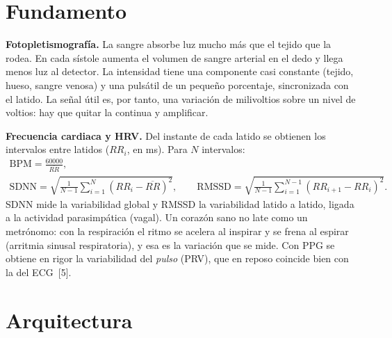 \documentclass[11pt,a4paper]{article}
\begin{document}
\section{Fundamento}

\textbf{Fotopletismografía.} La sangre absorbe luz mucho más que el tejido que la rodea. En
cada sístole aumenta el volumen de sangre arterial en el dedo y llega menos luz al detector.
La intensidad tiene una componente casi constante (tejido, hueso, sangre venosa) y una
pulsátil de un pequeño porcentaje, sincronizada con el latido. La señal útil es, por tanto,
una variación de milivoltios sobre un nivel de voltios: hay que quitar la continua y
amplificar.

\textbf{Frecuencia cardiaca y HRV.} Del instante de cada latido se obtienen los intervalos
entre latidos ($RR_i$, en ms). Para $N$ intervalos:
\begin{gather*}
  \mathrm{BPM} = \frac{60000}{\overline{RR}}, \\
  \mathrm{SDNN} = \sqrt{\frac{1}{N-1}\sum_{i=1}^{N}\left(RR_i - \overline{RR}\right)^2},
  \qquad
  \mathrm{RMSSD} = \sqrt{\frac{1}{N-1}\sum_{i=1}^{N-1}\left(RR_{i+1} - RR_i\right)^2}.
\end{gather*}
SDNN mide la variabilidad global y RMSSD la variabilidad latido a latido, ligada a la
actividad parasimpática (vagal). Un corazón sano no late como un metrónomo: con la
respiración el ritmo se acelera al inspirar y se frena al espirar (arritmia sinusal
respiratoria), y esa es la variación que se mide. Con PPG se obtiene en rigor la variabilidad
del \emph{pulso} (PRV), que en reposo coincide bien con la del ECG~[5].

\section{Arquitectura}
\end{document}
